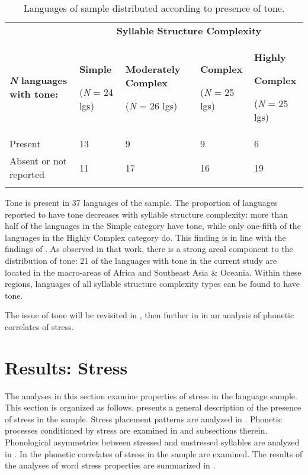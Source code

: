 \begin{table}
\begin{tabularx}{\textwidth}{XXXXX}
\lsptoprule
 & \multicolumn{4}{c}{ \textbf{Syllable Structure Complexity}}\\
 \textbf{\textit{N}} \textbf{languages with tone:} & { \textbf{Simple}}

 (\textit{N} = 24 lgs) & { \textbf{Moderately Complex}}

 (\textit{N} = 26 lgs) & { \textbf{Complex}}

 (\textit{N} = 25 lgs) & { \textbf{Highly} }

{ \textbf{Complex}}

 (\textit{N} = 25 lgs)\\
 Present & 13 & 9 & 9 & 6\\
 Absent or not reported & 11 & 17 & 16 & 19\\
\lspbottomrule
\end{tabularx}
\caption{\label{tab:5.1}Languages of sample distributed according to presence of tone.}
\end{table}

  Tone is present in 37 languages of the sample. The proportion of languages reported to have tone decreases with syllable structure complexity: more than half of the languages in the Simple category have tone, while only one-fifth of the languages in the Highly Complex category do. This finding is in line with the findings of \citet{Maddieson2013d}. As observed in that work, there is a strong areal component to the distribution of tone: 21 of the languages with tone in the current study are located in the macro-areas of Africa and Southeast Asia \& Oceania. Within these regions, languages of all syllable structure complexity types can be found to have tone.

  The issue of tone will be revisited in , then further in  in an analysis of phonetic correlates of stress.

\section{Results: Stress}\label{sec:5.4}

  The analyses in this section examine properties of stress in the language sample. This section is organized as follows.  presents a general description of the presence of stress in the sample. Stress placement patterns are analyzed in . Phonetic processes conditioned by stress are examined in  and subsections therein. Phonological asymmetries between stressed and unstressed syllables are analyzed in . In  the phonetic correlates of stress in the sample are examined. The results of the analyses of word stress properties are summarized in .


